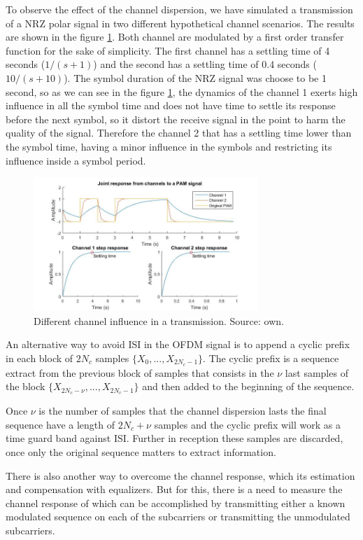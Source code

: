 To observe the effect of the channel dispersion, we have simulated a transmission of a NRZ polar signal in two different hypothetical channel scenarios. The results are shown in the figure \ref{fig:channel_influence}. Both channel are modulated by a first order transfer function for the sake of simplicity. The first channel has a settling time of 4 seconds ($1/(s+1)$) and the second has a settling time of 0.4 seconds ($10/(s+10)$). The symbol duration of the NRZ signal was choose to be 1 second, so as we can see in the figure \ref{fig:channel_influence}, the dynamics of the channel 1 exerts high influence in all the symbol time and does not have time to settle its response before the next symbol, so it distort the receive signal in the point to harm the quality of the signal. Therefore the channel 2 that has a settling time lower than the symbol time, having a minor influence in the symbols and restricting its influence inside a symbol period.

\begin{figure}[h]
\begin{center}
\includegraphics[width=8.5cm]{images/channel_influence.jpg}
\caption{Different channel influence in a transmission. Source: own.}
\label{fig:channel_influence} 
\end{center}
\end{figure}

An alternative way to avoid ISI in the OFDM signal is to append a cyclic prefix in each block of $2N_c$ samples $\{X_0,...,X_{2N_c-1}\}$. The cyclic prefix is a sequence extract from the previous block of samples that consists in the $\nu$ last samples of the block $\{X_{2N_c-\nu},...,X_{2N_c-1}\}$ and then added to the beginning of the sequence. 

Once $\nu$ is the number of samples that the channel dispersion lasts the final sequence have a length of $2N_c+\nu$ samples and the cyclic prefix will work as a time guard band against ISI. Further in reception these samples are discarded, once only the original sequence matters to extract information.

There is also another way to overcome the channel response, which its estimation and compensation with equalizers. But for this, there is a need to measure the channel response of which can be accomplished by transmitting either a known modulated sequence on each of the subcarriers or transmitting the unmodulated subcarriers.
